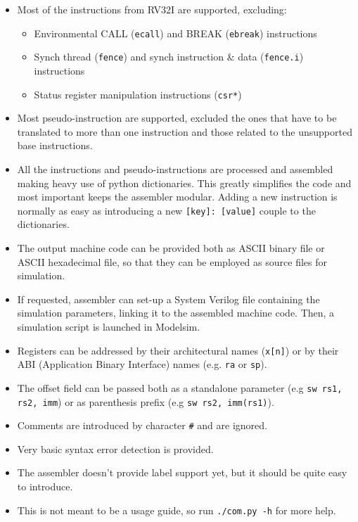 \begin{itemize}
   \item Most of the instructions from RV32I are supported, excluding:
   \begin{itemize}
      \item Environmental CALL (\texttt{ecall}) and BREAK (\texttt{ebreak}) instructions
      \item Synch thread (\texttt{fence}) and synch instruction \& data (\texttt{fence.i}) instructions
      \item Status register manipulation instructions (\texttt{csr*})
   \end{itemize}
   \item Most pseudo-instruction are supported, excluded the ones that have to be translated to more than one instruction and those related to the unsupported base instructions.
   \item All the instructions and pseudo-instructions are processed and assembled making heavy use of python dictionaries. This greatly simplifies the code and most important keeps the assembler modular. Adding a new instruction is normally as easy as introducing a new \texttt{[key]: [value]} couple to the dictionaries. 
   \item The output machine code can be provided both as ASCII binary file or ASCII hexadecimal file, so that they can be employed as source files for simulation.
   \item If requested, assembler can set-up a System Verilog file containing the simulation parameters, linking it to the assembled machine code. Then, a simulation script is launched in Modelsim. 
   \item Registers can be addressed by their architectural names (\texttt{x[n]}) or by their ABI (Application Binary Interface) names (e.g. \texttt{ra} or \texttt{sp}). 
   \item The offset field can be passed both as a standalone parameter (e.g \texttt{sw rs1, rs2, imm}) or as parenthesis prefix (e.g \texttt{sw rs2, imm(rs1)}). 
   \item Comments are introduced by character \texttt{\#} and are ignored.
   \item Very basic syntax error detection is provided.
   \item The assembler doesn't provide label support yet, but it should be quite easy to introduce. 
   \item This is not meant to be a usage guide, so run \texttt{./com.py -h} for more help.
\end{itemize}

